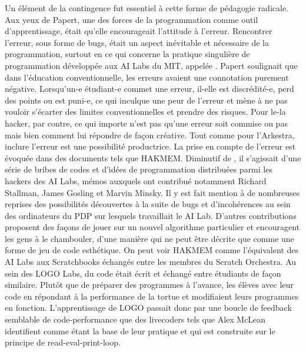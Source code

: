 {Un \'el\'ement de la contingence fut essentiel \`a cette forme de
p\'edagogie radicale. Aux yeux de Papert, une des forces de la
programmation comme outil d'apprentissage, \'etait qu'elle encourageait
l'attitude \`a l'erreur. Rencontrer l'erreur, sous forme de bugs,
\'etait un aspect in\'evitable et n\'ecessaire de la programmation,
surtout en ce qui concerne la pratique singuli\`ere de programmation
d\'evelopp\'ee aux AI Labs du MIT, appel\'ee . Papert
soulignait que dans l'\'education conventionnelle, les erreurs avaient
une connotation purement n\'egative. Lorsqu'un{}-e \'etudiant{}-e
commet une erreur, il{}-elle est discr\'edit\'e{}-e, perd des points ou
est puni{}-e, ce qui inculque une peur de l'erreur et m\`ene \`a ne pas
vouloir s'\'ecarter des limites conventionnelles et prendre des
risques. Pour le{}-la hacker, par contre, ce qui importe n'est pas
qu'une erreur soit commise ou pas mais bien comment lui r\'epondre de
fa\c{c}on cr\'eative. Tout comme pour l'Arkestra, inclure l'erreur est
une possibilit\'e productrice. La prise en compte de l'erreur est
\'evoqu\'ee dans des documents tels que HAKMEM. Diminutif de , il s'agissait d'une s\'erie de bribes de codes et d'id\'ees de
programmation distribu\'ees parmi les hackers des AI Labs, m\'emos
auxquels ont contribu\'e notamment Richard Stallman, James Gosling et
Marvin Minsky. Il y est fait mention \`a de nombreuses reprises des
possibilit\'es d\'ecouvertes \`a la suite de bugs et d'incoh\'erences
au sein des ordinateurs du PDP sur lesquels travaillait le AI Lab.
D'autres contributions proposent des fa\c{c}ons de jouer sur un nouvel
algorithme particulier et encouragent les gens \`a le chambouler, d'une
mani\`ere qui ne peut \^etre d\'ecrite que comme une forme de jeu de
code esth\'etique. On peut voir HAKMEM comme l'\'equivalent des AI Labs
aux Scratchbooks \'echang\'es entre les membres du Scratch Orchestra.
Au sein des LOGO Labs, du code \'etait \'ecrit et \'echang\'e entre
\'etudiants de fa\c{c}on similaire. Plut\^ot que de pr\'eparer des
programmes \`a l'avance, les \'el\`eves  avec leur code
en r\'epondant \`a la performance de la tortue et modifiaient leurs
programmes en fonction. L'apprentissage de LOGO passait donc par une
boucle de feedback semblable de code{}-performance que des livecoders
tels que Alex McLean identifient comme \'etant la base de leur pratique
et qui est construite sur le principe de read{}-eval{}-print{}-loop.

}
